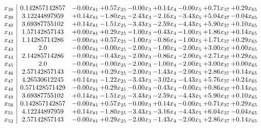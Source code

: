 \documentclass[8pt]{article}
\begin{document}
\[\begin{array}{c| c c@{\hskip 2pt} c@{\hskip 2pt} c@{\hskip 2pt} c@{\hskip 2pt} c@{\hskip 2pt} c@{\hskip 2pt} c@{\hskip 2pt} }
 x_{38}   &  0.142857142857 & -0.00 x_{81} & +  0.57 x_{25} & -0.00 x_{3} & +  0.14 x_{4} & -0.00 x_{5} & +  0.71 x_{37} & +  0.29 x_{65}\\
 x_{39}   &  3.12244897959 & +  0.14 x_{81} & -1.80 x_{25} & -2.43 x_{3} & -2.16 x_{4} & -3.43 x_{5} & +  5.04 x_{37} & -0.04 x_{65}\\
 x_{40}   &  3.69387755102 & +  0.14 x_{81} & -1.51 x_{25} & -3.43 x_{3} & -2.59 x_{4} & -4.43 x_{5} & +  5.90 x_{37} & +  0.10 x_{65}\\
 x_{41}   &  1.57142857143 & +  0.00 x_{81} & +  0.29 x_{25} & -1.00 x_{3} & -0.43 x_{4} & -1.00 x_{5} & +  1.86 x_{37} & +  0.14 x_{65}\\
 x_{42}   &  1.14285714286 & -0.00 x_{81} & +  0.57 x_{25} & -1.00 x_{3} & -0.86 x_{4} & -1.00 x_{5} & +  1.71 x_{37} & +  0.29 x_{65}\\
 x_{43}   &  2.0 & -0.00 x_{81} & -0.00 x_{25} & -2.00 x_{3} & -1.00 x_{4} & -2.00 x_{5} & +  3.00 x_{37} & +  0.00 x_{65}\\
 x_{44}   &  2.14285714286 & -0.00 x_{81} & -0.43 x_{25} & -2.00 x_{3} & -0.86 x_{4} & -2.00 x_{5} & +  2.71 x_{37} & +  0.29 x_{65}\\
 x_{45}   &  2.0 & -0.00 x_{81} & -0.00 x_{25} & -2.00 x_{3} & -1.00 x_{4} & -2.00 x_{5} & +  3.00 x_{37} & +  0.00 x_{65}\\
 x_{46}   &  2.57142857143 & -0.00 x_{81} & +  0.29 x_{25} & -2.00 x_{3} & -1.43 x_{4} & -2.00 x_{5} & +  2.86 x_{37} & +  0.14 x_{65}\\
 x_{47}   &  4.26530612245 & +  0.14 x_{81} & -1.22 x_{25} & -3.43 x_{3} & -3.02 x_{4} & -4.43 x_{5} & +  5.76 x_{37} & +  0.24 x_{65}\\
 x_{48}   &  0.571428571429 & -0.00 x_{81} & +  0.29 x_{25} & -0.00 x_{3} & -0.43 x_{4} & -0.00 x_{5} & +  0.86 x_{37} & +  0.14 x_{65}\\
 x_{49}   &  3.69387755102 & +  0.14 x_{81} & -1.51 x_{25} & -3.43 x_{3} & -2.59 x_{4} & -4.43 x_{5} & +  5.90 x_{37} & +  0.10 x_{65}\\
 x_{50}   &  0.142857142857 & -0.00 x_{81} & +  0.57 x_{25} & -0.00 x_{3} & +  0.14 x_{4} & -0.00 x_{5} & +  0.71 x_{37} & +  0.29 x_{65}\\
 x_{51}   &  4.12244897959 & +  0.14 x_{81} & -1.80 x_{25} & -3.43 x_{3} & -3.16 x_{4} & -4.43 x_{5} & +  6.04 x_{37} & -0.04 x_{65}\\
 x_{52}   &  2.57142857143 & -0.00 x_{81} & +  0.29 x_{25} & -2.00 x_{3} & -1.43 x_{4} & -2.00 x_{5} & +  2.86 x_{37} & +  0.14 x_{65}\\

\end{array}\]
\end{document}
